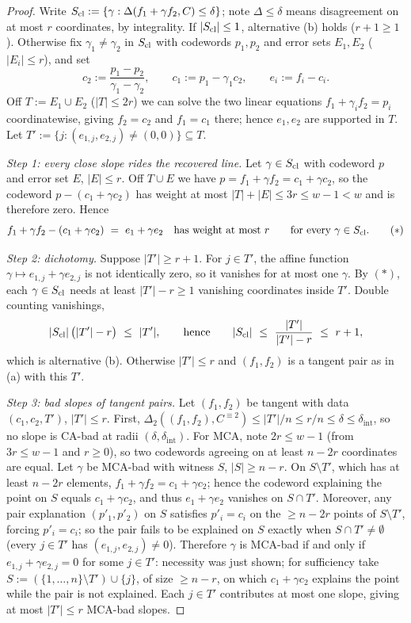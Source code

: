 \documentclass[11pt]{article}
\theoremstyle{definition}
\theoremstyle{remark}
\newcommand{\dist}{\Delta}
\begin{document}
\begin{proof}
Write $S_{\rm cl}:=\{\gamma:\dist(f_1+\gamma f_2,C)\le\delta\}$; note $\dist\le\delta$ means disagreement on at most $r$ coordinates, by integrality. If $|S_{\rm cl}|\le1$, alternative (b) holds ($r+1\ge1$). Otherwise fix $\gamma_1\ne\gamma_2$ in $S_{\rm cl}$ with codewords $p_1,p_2$ and error sets $E_1,E_2$ ($|E_i|\le r$), and set
\[
c_2:=\frac{p_1-p_2}{\gamma_1-\gamma_2},
\qquad
c_1:=p_1-\gamma_1c_2,
\qquad
e_i:=f_i-c_i .
\]
Off $T:=E_1\cup E_2$ ($|T|\le2r$) we can solve the two linear equations $f_1+\gamma_if_2=p_i$ coordinatewise, giving $f_2=c_2$ and $f_1=c_1$ there; hence $e_1,e_2$ are supported in $T$. Let $T':=\{j:(e_{1,j},e_{2,j})\ne(0,0)\}\subseteq T$.

\emph{Step 1: every close slope rides the recovered line.} Let $\gamma\in S_{\rm cl}$ with codeword $p$ and error set $E$, $|E|\le r$. Off $T\cup E$ we have $p=f_1+\gamma f_2=c_1+\gamma c_2$, so the codeword $p-(c_1+\gamma c_2)$ has weight at most $|T|+|E|\le3r\le w-1<w$ and is therefore zero. Hence
\[
f_1+\gamma f_2-(c_1+\gamma c_2)\ =\ e_1+\gamma e_2
\quad\text{has weight at most } r
\qquad\text{for every }\gamma\in S_{\rm cl}. \tag{$*$}
\]

\emph{Step 2: dichotomy.} Suppose $|T'|\ge r+1$. For $j\in T'$, the affine function $\gamma\mapsto e_{1,j}+\gamma e_{2,j}$ is not identically zero, so it vanishes for at most one $\gamma$. By $(*)$, each $\gamma\in S_{\rm cl}$ needs at least $|T'|-r\ge1$ vanishing coordinates inside $T'$. Double counting vanishings,
\[
|S_{\rm cl}|\,\bigl(|T'|-r\bigr)\ \le\ |T'|,
\qquad\text{hence}\qquad
|S_{\rm cl}|\ \le\ \frac{|T'|}{|T'|-r}\ \le\ r+1,
\]
which is alternative (b). Otherwise $|T'|\le r$ and $(f_1,f_2)$ is a tangent pair as in (a) with this $T'$.

\emph{Step 3: bad slopes of tangent pairs.} Let $(f_1,f_2)$ be tangent with data $(c_1,c_2,T')$, $|T'|\le r$. First, $\dist_2((f_1,f_2),C^{\equiv2})\le|T'|/n\le r/n\le\delta\le\delta_{\mathrm{int}}$, so no slope is CA-bad at radii $(\delta,\delta_{\mathrm{int}})$. For MCA, note $2r\le w-1$ (from $3r\le w-1$ and $r\ge0$), so two codewords agreeing on at least $n-2r$ coordinates are equal. Let $\gamma$ be MCA-bad with witness $S$, $|S|\ge n-r$. On $S\setminus T'$, which has at least $n-2r$ elements, $f_1+\gamma f_2=c_1+\gamma c_2$; hence the codeword explaining the point on $S$ equals $c_1+\gamma c_2$, and thus $e_1+\gamma e_2$ vanishes on $S\cap T'$. Moreover, any pair explanation $(p'_1,p'_2)$ on $S$ satisfies $p'_i=c_i$ on the $\ge n-2r$ points of $S\setminus T'$, forcing $p'_i=c_i$; so the pair fails to be explained on $S$ exactly when $S\cap T'\ne\emptyset$ (every $j\in T'$ has $(e_{1,j},e_{2,j})\ne0$). Therefore $\gamma$ is MCA-bad if and only if $e_{1,j}+\gamma e_{2,j}=0$ for some $j\in T'$: necessity was just shown; for sufficiency take $S:=(\{1,\dots,n\}\setminus T')\cup\{j\}$, of size $\ge n-r$, on which $c_1+\gamma c_2$ explains the point while the pair is not explained. Each $j\in T'$ contributes at most one slope, giving at most $|T'|\le r$ MCA-bad slopes.


\end{proof}
\end{document}
